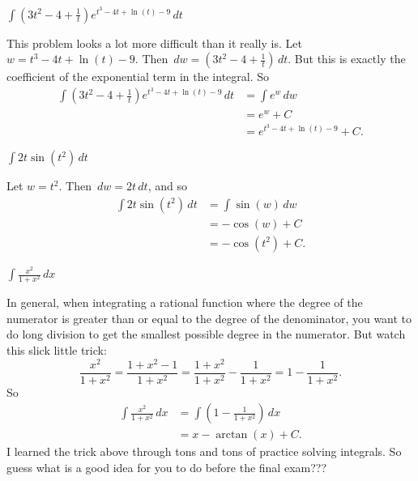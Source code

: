 \documentclass[handout, nooutcomes]{ximera}
\renewenvironment{freeResponse}{
\ifhandout\setbox0\vbox\bgroup\else
\begin{trivlist}\item[\hskip \labelsep\bfseries Solution:\hspace{2ex}]
\fi}
{\ifhandout\egroup\else
\end{trivlist}
\fi}
\renewcommand{\d}{\,d}
\begin{document}
\begin{problem}
  $\int \left( 3t^2 - 4 + \frac{1}{t} \right) e^{t^3 - 4t + \ln(t) -
    9} \d t$
  \begin{freeResponse}
    This problem looks a lot more difficult than it really is.
    Let $w=t^3 - 4t + \ln(t) - 9$.
    Then $\d w = \left( 3t^2 - 4 + \frac{1}{t} \right) \d t$.
    But this is exactly the coefficient of the exponential term in the integral.
    So
    \begin{align*}
      \int \left( 3t^2 - 4 + \frac{1}{t} \right) e^{t^3 - 4t + \ln(t) - 9} \d t &= \int e^w \d w  \\                                                                           &= e^w + C  \\                                                                                &= e^{t^3 - 4t + \ln(t) - 9} + C.
    \end{align*}
  \end{freeResponse}
\end{problem}

\begin{problem}
$\int 2t \sin \left( t^2 \right) \d t$
  \begin{freeResponse}
    Let $w=t^2$.  Then $\d w = 2t \d t$, and so
    \begin{align*}
      \int 2t \sin(t^2) \d t &= \int \sin(w) \d w  \\
                             &= - \cos(w) + C  \\
                             &= - \cos(t^2) + C.
    \end{align*}
  \end{freeResponse}
\end{problem}

\begin{problem}
  $\int \frac{x^2 }{1 + x^2} \d x$
  \begin{freeResponse}
    In general, when integrating a rational function where the degree of the numerator is greater than or equal to the degree of the denominator, you want to do long division to get the smallest possible degree in the numerator.
    But watch this slick little trick:
    \begin{equation*}
      \frac{x^2}{1+x^2} = \frac{1 + x^2 - 1}{1+x^2} = \frac{1+x^2}{1+x^2} - \frac{1}{1+x^2} = 1 - \frac{1}{1+x^2}.
    \end{equation*}
    So
    \begin{align*}
      \int \frac{x^2 }{1 + x^2} \d x &= \int \left( 1 - \frac{1}{1+x^2} \right) \d x  \\                                     &= x - \arctan(x) + C.
    \end{align*}
    I learned the trick above through tons and tons of practice solving integrals.
    So guess what is a good idea for you to do before the final exam???
  \end{freeResponse}
\end{problem}
\end{document}
